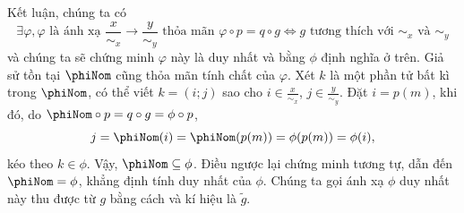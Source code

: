 Kết luận, chúng ta có \begin{equation*}
   \exists \varphi, \varphi \text{~là ánh xạ~}\frac{x}{\sim_x} \to \frac{y}{\sim_y}\text{~thỏa mãn~}\varphi \circ p = q \circ g \iff g \text{~tương thích với $\sim_x$ và $\sim_y$}
\end{equation*}
và chúng ta sẽ chứng minh $\varphi$ này là duy nhất và bằng $\phi$ định nghĩa ở trên. Giả sử tồn tại $\phiNom$ cũng thỏa mãn tính chất của $\varphi$. Xét $k$ là một phần tử bất kì trong $\phiNom$, có thể viết $k = (i; j)$ sao cho $i \in \frac{x}{\sim_x}$, $j \in \frac{y}{\sim_y}$. Đặt $i = p(m)$, khi đó, do $\phiNom \circ p = q \circ g = \phi \circ p$, \begin{equation*}
   j = \phiNom(i) = \phiNom(p(m)) = \phi(p(m)) = \phi(i),
\end{equation*} 
kéo theo $k \in \phi$. Vậy, $\phiNom \subseteq \phi$. Điều ngược lại chứng minh tương tự, dẫn đến $\phiNom = \phi$, khẳng định tính duy nhất của $\phi$. Chúng ta gọi ánh xạ $\phi$ duy nhất này thu được từ $g$ bằng cách  và kí hiệu là $\tilde{g}$. 

